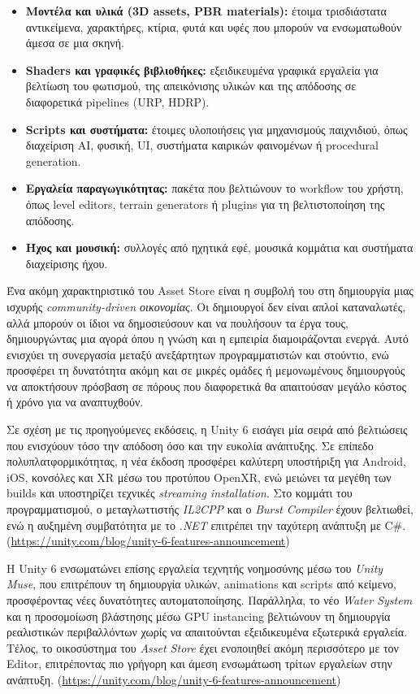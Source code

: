 \begin{itemize}
    \item \textbf{Μοντέλα και υλικά (3D assets, PBR materials):} έτοιμα τρισδιάστατα αντικείμενα, χαρακτήρες, κτίρια, φυτά και υφές που μπορούν να ενσωματωθούν άμεσα σε μια σκηνή.
    \item \textbf{Shaders και γραφικές βιβλιοθήκες:} εξειδικευμένα γραφικά εργαλεία για βελτίωση του φωτισμού, της απεικόνισης υλικών και της απόδοσης σε διαφορετικά pipelines (URP, HDRP).
    \item \textbf{Scripts και συστήματα:} έτοιμες υλοποιήσεις για μηχανισμούς παιχνιδιού, όπως διαχείριση AI, φυσική, UI, συστήματα καιρικών φαινομένων ή procedural generation.
    \item \textbf{Εργαλεία παραγωγικότητας:} πακέτα που βελτιώνουν το workflow του χρήστη, όπως level editors, terrain generators ή plugins για τη βελτιστοποίηση της απόδοσης.
    \item \textbf{Ήχος και μουσική:} συλλογές από ηχητικά εφέ, μουσικά κομμάτια και συστήματα διαχείρισης ήχου.
\end{itemize}

Ένα ακόμη χαρακτηριστικό του Asset Store είναι η συμβολή του στη δημιουργία μιας ισχυρής \textit{community-driven οικονομίας}. Οι δημιουργοί δεν είναι απλοί καταναλωτές, αλλά μπορούν οι ίδιοι να δημοσιεύσουν και να πουλήσουν τα έργα τους, δημιουργώντας μια αγορά όπου η γνώση και η εμπειρία διαμοιράζονται ενεργά. Αυτό ενισχύει τη συνεργασία μεταξύ ανεξάρτητων προγραμματιστών και στούντιο, ενώ προσφέρει τη δυνατότητα ακόμη και σε μικρές ομάδες ή μεμονωμένους δημιουργούς να αποκτήσουν πρόσβαση σε πόρους που διαφορετικά θα απαιτούσαν μεγάλο κόστος ή χρόνο για να αναπτυχθούν.

Σε σχέση με τις προηγούμενες εκδόσεις, η Unity 6 εισάγει μία σειρά από βελτιώσεις που ενισχύουν τόσο την απόδοση όσο και την ευκολία ανάπτυξης. Σε επίπεδο πολυπλατφορμικότητας, η νέα έκδοση προσφέρει καλύτερη υποστήριξη για Android, iOS, κονσόλες και XR μέσω του προτύπου OpenXR, ενώ μειώνει τα μεγέθη των builds και υποστηρίζει τεχνικές \textit{streaming installation}. Στο κομμάτι του προγραμματισμού, ο μεταγλωττιστής \textit{IL2CPP} και ο \textit{Burst Compiler} έχουν βελτιωθεί, ενώ η αυξημένη συμβατότητα με το \textit{.NET} επιτρέπει την ταχύτερη ανάπτυξη με C\#. (\href{https://unity.com/blog/unity-6-features-announcement}{https://unity.com/blog/unity-6-features-announcement})

Η Unity 6 ενσωματώνει επίσης εργαλεία τεχνητής νοημοσύνης μέσω του \textit{Unity Muse}, που επιτρέπουν τη δημιουργία υλικών, animations και scripts από κείμενο, προσφέροντας νέες δυνατότητες αυτοματοποίησης. Παράλληλα, το νέο \textit{Water System} και η προσομοίωση βλάστησης μέσω GPU instancing βελτιώνουν τη δημιουργία ρεαλιστικών περιβαλλόντων χωρίς να απαιτούνται εξειδικευμένα εξωτερικά εργαλεία. Τέλος, το οικοσύστημα του \textit{Asset Store} έχει ενοποιηθεί ακόμη περισσότερο με τον Editor, επιτρέποντας πιο γρήγορη και άμεση ενσωμάτωση τρίτων εργαλείων στην ανάπτυξη. (\href{https://unity.com/blog/unity-6-features-announcement}{https://unity.com/blog/unity-6-features-announcement})


